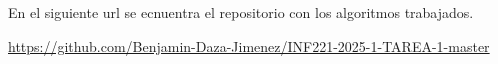 En el siguiente url se ecnuentra el repositorio con los algoritmos trabajados.
\begin{mdframed}
    \begin{center}
        {\Large \url{https://github.com/Benjamin-Daza-Jimenez/INF221-2025-1-TAREA-1-master}}
    \end{center}
\end{mdframed}


